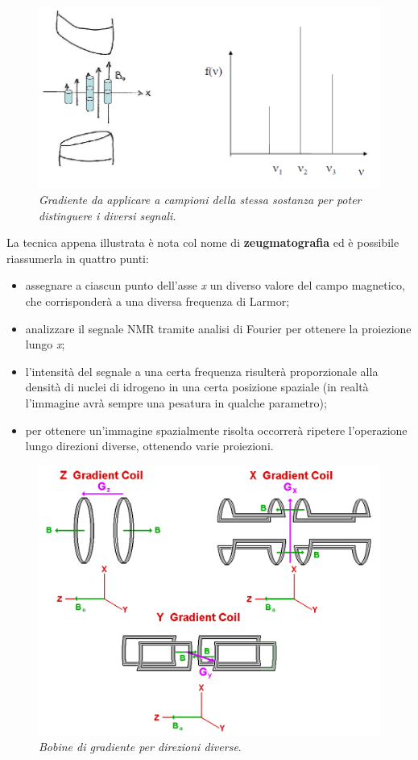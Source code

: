 \documentclass{report}
\numberwithin{equation}{section}
\numberwithin{figure}{section}
\begin{document}
\begin{figure}[htp]
\centering
\includegraphics[scale=0.6]{immagini/gradiente.png}
\caption{\label{fig:gradiente} \textit{Gradiente da applicare a campioni della stessa sostanza per poter distinguere i diversi segnali}.}
\end{figure}

\noindent La tecnica appena illustrata è nota col nome di \textbf{zeugmatografia} ed è possibile riassumerla in quattro punti:
\begin{itemize}[label=$-$]
    \item assegnare a ciascun punto dell'asse \textit{x} un diverso valore del campo magnetico, che corrisponderà a una diversa frequenza di Larmor;
    \item analizzare il segnale NMR tramite analisi di Fourier per ottenere la proiezione lungo \textit{x};
    \item l'intensità del segnale a una certa frequenza risulterà proporzionale alla densità di nuclei di idrogeno in una certa posizione spaziale (in realtà l'immagine avrà sempre una pesatura in qualche parametro);
    \item per ottenere un'immagine spazialmente risolta occorrerà ripetere l'operazione lungo direzioni diverse, ottenendo varie proiezioni.
\end{itemize}

\begin{figure}[htp]
\centering
\includegraphics[scale=0.5]{immagini/bobine.png}
\caption{\label{fig:bobine} \textit{Bobine di gradiente per direzioni diverse}.}
\end{figure}
\end{document}
